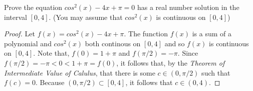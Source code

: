 \documentclass[12pt]{article}
\newenvironment{problem}[2][Problem]{\begin{trivlist}
		\item[\hskip \labelsep {\bfseries #1}\hskip \labelsep {\bfseries #2.}]}{\end{trivlist}}
\begin{document}
	\begin{problem}{48}
		Prove the equation $cos^{2}(x)-4x+\pi = 0$ has a real number solution in the interval $[0,4]$. (You may assume that $cos^{2}(x)$ is continuous on $[0,4]$)
		\begin{proof}
			Let $f(x)=cos^{2}(x)-4x+\pi$. The function $f(x)$ is a sum of a polynomial and $cos^{2}(x)$ both continous on $[0,4]$ and so $f(x)$ is continuous on $[0,4]$. Note that, $f(0) = 1+\pi$ and $f(\pi/2) = -\pi$. Since $f(\pi/2)=-\pi <0<1+\pi=f(0)$, it follows that, by the \textit{Theorem of Intermediate Value of Calulus}, that there is some $c\in (0,\pi/2)$ such that $f(c)=0$. Because $(0,\pi/2)\subset [0,4]$, it follows that $c\in (0,4)$. 
		\end{proof}
	\end{problem}
\end{document}
